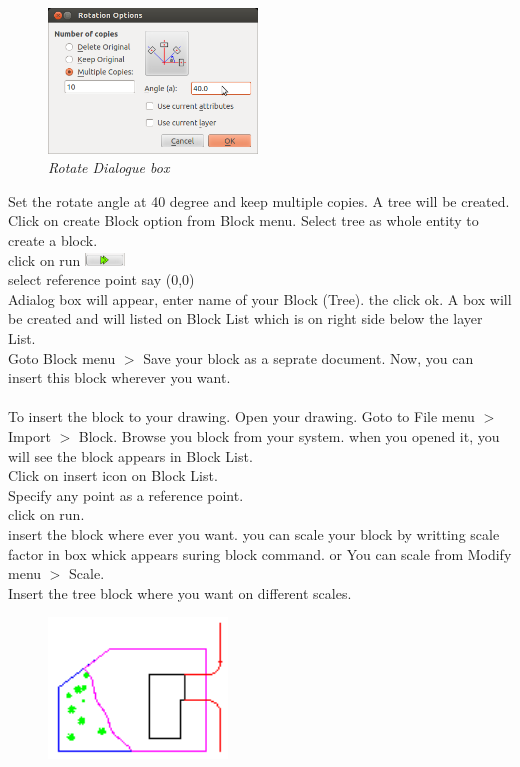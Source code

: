 \begin{enumerate}
{\begin{figure}[h!]
       \centering\includegraphics[width=210px]{./images-yard/rotate.png}
       \caption{\small \sl Rotate Dialogue box}
       \end{figure}
       \vspace{.5in}
       Set the rotate angle at 40 degree and keep multiple copies. A tree will be created.\\
Click on create Block option from Block menu. Select tree as whole entity to create a block.\\
click on run \includegraphics[width=40px]{./images-yard/run.png}\\
select reference point say (0,0)\\
Adialog box will appear, enter name of your Block (Tree). the click ok. A box will be created and will listed on Block List which is on right side below the layer List.\\
Goto Block menu $>$ Save your block as a seprate document. 
Now, you can insert this block wherever you want.
\\\\
To insert the block to your drawing. Open your drawing. Goto to File menu $>$ Import $>$ Block. Browse you block from your system. when you opened it, you will see the block appears in Block List.\\
Click on insert icon on Block List.\\
Specify any point as a reference point.\\
click on run.\\
insert the block where ever you want. you can scale your block by writting scale factor in box whick appears suring block command. or You can scale from Modify menu $>$ Scale.\\
Insert the tree block where you want on different scales.\\
\begin{figure}[h!]
       \centering\includegraphics[width=180px]{./images-yard/tree.png}

\end{figure}}
\end{enumerate}
